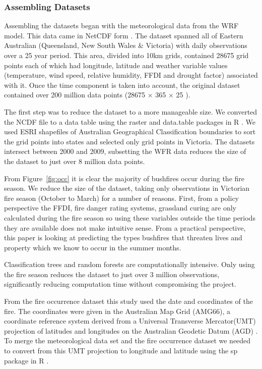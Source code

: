 \documentclass[11pt,a4paper]{article}
\begin{document}
\subsubsection{Assembling Datasets}

Assembling the datasets began with the meteorological data from the WRF model. This data came in NetCDF form \citep{ncdf}. The dataset spanned all of Eastern Australian (Queensland, New South Wales \& Victoria) with daily observations over a 25 year period. This area, divided into 10km grids, contained 28675 grid points each of which had longitude, latitude and weather variable values (temperature, wind speed, relative humidity, FFDI and drought factor) associated with it. Once the time component is taken into account, the original dataset contained over 200 million data points (28675 $\times$ 365 $\times$ 25 ).

The first step was to reduce the dataset to a more manageable size. We converted the NCDF file to a data table using the raster and data.table packages in R \citep{raster, datatable}. We used ESRI shapefiles of Australian Geographical Classification boundaries \citep{ABS1259} to sort the grid points into states and selected only grid points in Victoria. The datasets intersect between 2000 and 2009, subsetting the WFR data reduces the size of the dataset to just over 8 million data points.

From Figure~\ref{fig:occ} it is clear the majority of bushfires occur during the fire season. We reduce the size of the dataset, taking only observations in Victorian fire season (October to March) for a number of reasons. First, from a policy perspective the FFDI, fire danger rating systems, grassland curing are only calculated during the fire season so using these variables outside the time periods they are available does not make intuitive sense. From a practical perspective, this paper is looking at predicting the types bushfires that threaten lives and property which we know to occur in the summer months.

Classification trees and random forests are computationally intensive. Only using the fire season reduces the dataset to just over 3 million observations, significantly reducing computation time without compromising the project.

From the fire occurrence dataset this study used the date and coordinates of the fire. The coordinates were given in the Australian Map Grid (AMG66), a coordinate reference system derived from a Universal Transverse Mercator(UMT) projection of latitudes and longitudes on the Australian Geodetic Datum (AGD) \citep{featherstone96}. To merge the meteorological data set and the fire occurrence dataset we needed to convert from this UMT projection to longitude and latitude using the sp package in R \citep{sp08}.
\end{document}
